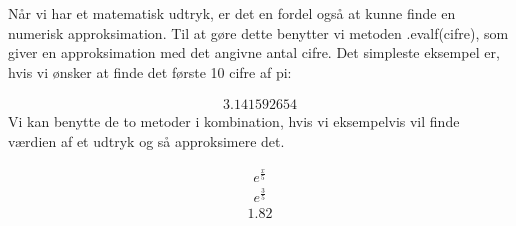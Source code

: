 \documentclass[letterpaper,10pt,english]{jupyterBook}
\begin{document}
Når vi har et matematisk udtryk, er det en fordel også at kunne finde en numerisk approksimation. Til at gøre dette benytter vi metoden .evalf(cifre), som giver en approksimation med det angivne antal cifre. Det simpleste eksempel er, hvis vi ønsker at finde det første 10 cifre af pi:

\begin{sphinxVerbatim}[commandchars=\\\{\}]
         
\end{sphinxVerbatim}
\begin{equation*}
\begin{split}\displaystyle 3.141592654\end{split}
\end{equation*}
Vi kan benytte de to metoder i kombination, hvis vi eksempelvis vil finde værdien af et udtryk og så approksimere det.

\begin{sphinxVerbatim}[commandchars=\\\{\}]
    

    

 
\end{sphinxVerbatim}
\begin{equation*}
\begin{split}\displaystyle e^{\frac{x}{5}}\end{split}
\end{equation*}\begin{equation*}
\begin{split}\displaystyle e^{\frac{3}{5}}\end{split}
\end{equation*}\begin{equation*}
\begin{split}\displaystyle 1.82\end{split}
\end{equation*}
\end{document}
